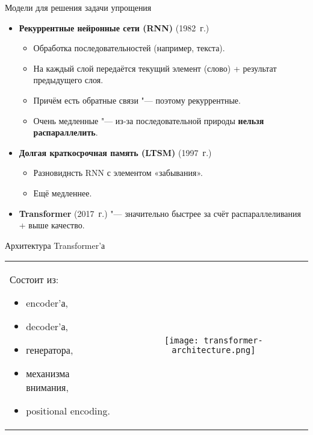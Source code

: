 \begin{frame}[fragile]{Модели для решения задачи упрощения}%
  \begin{itemize}%
    \item \textbf{Рекуррентные нейронные сети (RNN)} (1982~г.)
      \begin{itemize}%
         \item Обработка последовательностей (например, текста).
         \item На каждый слой передаётся текущий элемент (слово) + результат предыдущего слоя.
         \item Причём есть обратные связи "--- поэтому рекуррентные.
         \item Очень медленные "--- из-за последовательной природы \textbf{нельзя распараллелить}.
       \end{itemize} 
    \item \textbf{Долгая краткосрочная память (LTSM)} (1997~г.)
      \begin{itemize}%
        \item Разновиднсть RNN с элементом «забывания».
        \item Ещё медленнее.
      \end{itemize}
    \item \textbf{Transformer} (2017~г.) "--- значительно быстрее за счёт распараллеливания + выше качество.
  \end{itemize}
\end{frame}


\begin{frame}[fragile]{Архитектура Transformer'а}%
  \noindent\begin{tabularx}{\textwidth}{LC}%
    Состоит из:
    \begin{itemize}%
       \item encoder'а,
       \item decoder'а,
       \item генератора,
       \item механизма внимания,
       \item positional encoding.
     \end{itemize} & 
    \texttt{[image: transformer-architecture.png]}
  \end{tabularx}
\end{frame}


